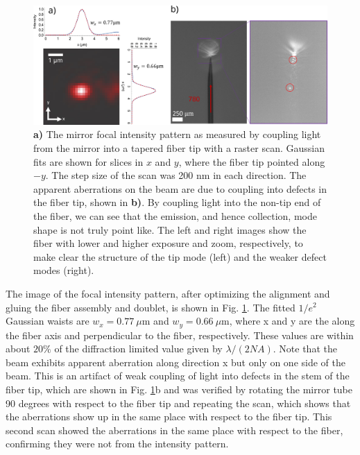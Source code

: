 \begin{figure}
    \centering
    \includegraphics[width=\textwidth]{Images/mirror_focus_fiber_scan.pdf}
    \caption{\textbf{a)} The mirror focal intensity pattern as measured by coupling light from the mirror into a tapered fiber tip with a raster scan. Gaussian fits are shown for slices in $x$ and $y$, where the fiber tip pointed along $-y$. The step size of the scan was 200 nm in each direction. The apparent aberrations on the beam are due to coupling into defects in the fiber tip, shown in \textbf{b)}. By coupling light into the non-tip end of the fiber, we can see that the emission, and hence collection, mode shape is not truly point like. The left and right images show the fiber with lower and higher exposure and zoom, respectively, to make clear the structure of the tip mode (left) and the weaker defect modes (right).}
    \label{fig:mirror_fiber_scan_post_gluing}
\end{figure}

The image of the focal intensity pattern, after optimizing the alignment and gluing the fiber assembly and doublet, is shown in Fig. \ref{fig:mirror_fiber_scan_post_gluing}. The fitted $1/e^2$ Gaussian waists are $w_x=0.77~\mu$m and $w_y = 0.66~\mu$m, where x and y are the along the fiber axis and perpendicular to the fiber, respectively. These values are within about $20\%$ of the diffraction limited value given by $\lambda/(2 NA)$. Note that the beam exhibits apparent aberration along direction x but only on one side of the beam. This is an artifact of weak coupling of light into defects in the stem of the fiber tip, which are shown in Fig.  \ref{fig:mirror_fiber_scan_post_gluing}b and was verified by rotating the mirror tube 90 degrees with respect to the fiber tip and repeating the scan, which shows that the aberrations show up in the same place with respect to the fiber tip. This second scan showed the aberrations in the same place with respect to the fiber, confirming they were not from the intensity pattern.


